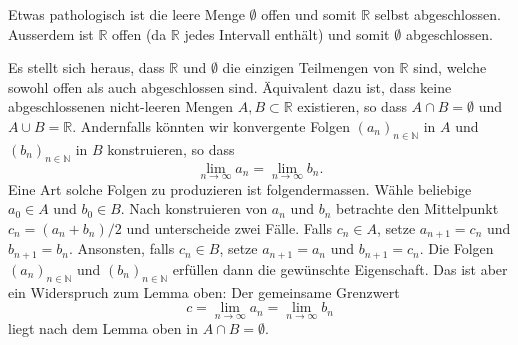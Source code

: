 \documentclass[../main.tex]{subfiles}
\begin{document}
\begin{remark}
  Etwas pathologisch ist die leere Menge $\emptyset$
  offen und somit $\mathbb{R}$ selbst abgeschlossen.
  Ausserdem ist $\mathbb{R}$ offen (da $\mathbb{R}$
  jedes Intervall enthält) und somit $\emptyset$ 
  abgeschlossen.

  Es stellt sich heraus, dass $\mathbb{R}$ und $\emptyset$ 
  die einzigen Teilmengen von $\mathbb{R}$ sind, welche
  sowohl offen als auch abgeschlossen sind.
  Äquivalent dazu ist, dass keine abgeschlossenen
  nicht-leeren Mengen $A, B \subset \mathbb{R}$ existieren,
  so dass $A \cap B = \emptyset$ und
  $A \cup B = \mathbb{R}$.
  Andernfalls könnten wir konvergente Folgen
  ${(a_{n})}_{n \in \mathbb{N}}$ in $A$
  und ${(b_{n})}_{n \in \mathbb{N}}$ in $B$ 
  konstruieren, so dass
  \[
    \lim_{n \to \infty} a_n = \lim_{n \to \infty} b_n.
  \]
  Eine Art solche Folgen zu produzieren ist folgendermassen.
  Wähle beliebige $a_0 \in A$ und $b_0 \in B$.
  Nach konstruieren von $a_n$ und $b_n$ betrachte
  den Mittelpunkt $c_n = (a_n + b_n)/2$ und unterscheide
  zwei Fälle. Falls $c_n \in A$, setze $a_{n+1} = c_n$ 
  und $b_{n+1} = b_n$. Ansonsten, falls $c_n \in B$, setze
  $a_{n+1} = a_n$ und $b_{n+1} = c_n$.
  Die Folgen ${(a_{n})}_{n \in \mathbb{N}}$ und
  ${(b_{n})}_{n \in \mathbb{N}}$ erfüllen dann
  die gewünschte Eigenschaft. Das ist aber ein
  Widerspruch zum Lemma oben: Der gemeinsame Grenzwert
  \[
    c = \lim_{n \to \infty} a_n = \lim_{n \to \infty} b_n
  \]
  liegt nach dem Lemma oben in $A \cap B = \emptyset$.
\end{remark}
\end{document}
